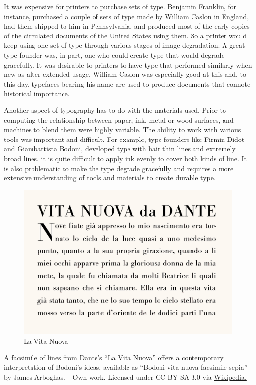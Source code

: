 It was expensive for printers to purchase sets of type. Benjamin
Franklin, for instance, purchased a couple of sets of type made by
William Caslon in England, had them shipped to him in Pennsylvania, and
produced most of the early copies of the circulated documents of the
United States using them. So a printer would keep using one set of type
through various stages of image degradation. A great type founder was,
in part, one who could create type that would degrade gracefully. It was
desirable to printers to have type that performed similarly when new as
after extended usage. William Caslon was especially good at this and, to
this day, typefaces bearing his name are used to produce documents that
connote historical importance.

Another aspect of typography has to do with the materials used. Prior to
computing the relationship between paper, ink, metal or wood surfaces,
and machines to blend them were highly variable. The ability to work
with various tools was important and difficult. For example, type
founders like Firmin Didot and Giambattista Bodoni, developed type with
hair thin lines and extremely broad lines. it is quite difficult to
apply ink evenly to cover both kinds of line. It is also problematic to
make the type degrade gracefully and requires a more extensive
understanding of tools and materials to create durable type.

\begin{figure}
\centering
\includegraphics{./fiBodoniVitaN.png}
\caption{La Vita Nuova}
\end{figure}

A facsimile of lines from Dante's ``La Vita Nuova'' offers a
contemporary interpretation of Bodoni's ideas, available as ``Bodoni
vita nuova facsimile sepia'' by James Arboghast - Own work. Licensed
under CC BY-SA 3.0 via
\href{http://en.wikipedia.org/wiki/File:Bodoni_vita_nuova_facsimile_sepia.png\#/media/File:Bodoni_vita_nuova_facsimile_sepia.png}{Wikipedia.}

